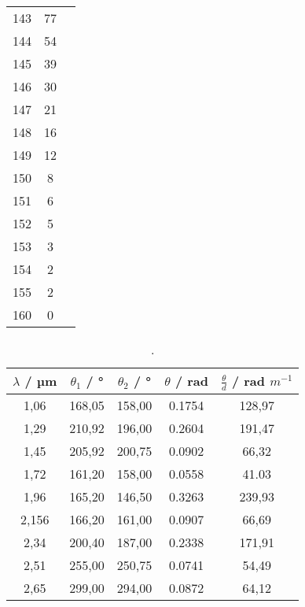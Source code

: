 \begin{table}[h]
\begin{tabular}{S[table-format=1.1] S S}
    143 & 77 \\
    144 & 54 \\
    145 & 39 \\
    146 & 30 \\
    147 & 21 \\
    148 & 16 \\
    149 & 12 \\
    150 & 8 \\
    151 & 6 \\
    152 & 5 \\
    153 & 3 \\
    154 & 2 \\
    155 & 2 \\
    160 & 0 \\
  \end{tabular}
\end{table}


\begin{table}[h]
  \centering
  \caption{.}
  \label{tab:probe1}
  \begin{tabular}{S[table-format=1.1] S S S S}
    {$\lambda$ / µm} & {$\theta_1$ / °} & {$\theta_2$ / °} & {$\theta$ / rad} & {$\frac{\theta}{d}$ / rad $m^{-1}$}\\
    ,06 &  168,05 &  158,00 & 0.1754 & 128,97\\
    1,29 &  210,92 &  196,00 & 0.2604 & 191,47\\
    1,45 &  205,92 &  200,75 & 0.0902 & 66,32\\
    1,72 &  161,20 &  158,00 & 0.0558 & 41.03\\
    1,96 &  165,20 &  146,50 & 0.3263 & 239,93\\
    2,156 & 166,20 &  161,00 & 0.0907 & 66,69\\
    2,34 & 200,40 &  187,00 & 0.2338 & 171,91\\
    2,51 & 255,00 &  250,75 & 0.0741 & 54,49\\
    2,65 & 299,00 &  294,00 & 0.0872 & 64,12\\
  \end{tabular}
\end{table}

